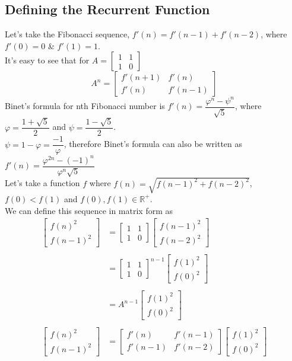 \documentclass[preprint,12pt]{elsarticle}
\begin{document}
	\subsection{Defining the Recurrent Function}
	Let's take the Fibonacci sequence, $f'(n) = f'(n - 1) + f'(n - 2)$, where $f'(0) = 0$ \& $f'(1) = 1$.\\
	It's easy to see that for $A  = \begin{bmatrix}1 & 1 \\ 1 & 0 \end{bmatrix}$ $$A^n = \begin{bmatrix}f'(n + 1) & f'(n) \\ f'(n) & f'(n - 1)\end{bmatrix}$$
	Binet's formula for nth Fibonacci number is $f'(n) = \dfrac{\varphi^n - \psi^n}{\sqrt{5}}$, where $\varphi = \dfrac{1 + \sqrt{5}}{2}$ and $\psi = \dfrac{1 - \sqrt{5}}{2}$\cite{Fn-wiki}.\\
	$\psi = 1 - \varphi = \dfrac{-1}{\varphi}$, therefore Binet's formula can also be written as 
	$f'(n) = \dfrac{\varphi^{2n} - (-1)^n}{\varphi^n\sqrt{5}}$\\
	Let's take a function \(f\) where $f(n) = \sqrt{f(n - 1)^2 + f(n - 2)^2}$, \(f(0) < f(1)\) and $f(0), f(1) \in \mathbb{R}^{+}$.\\
	We can define this sequence in matrix form as
	\begin{align*}
	\begin{bmatrix}f(n)^2 \\f(n - 1)^2\end{bmatrix} 
	&=
	\begin{bmatrix}1 & 1\\1 & 0\end{bmatrix}
	\begin{bmatrix}f(n - 1)^2\\f(n - 2)^2\end{bmatrix} \\\\
	&= \begin{bmatrix}1 & 1 \\1 & 0\end{bmatrix}^{\!n - 1}
	\begin{bmatrix}f(1)^2\\f(0)^2\end{bmatrix}\\\\
	&= A^{\!n - 1}\begin{bmatrix}f(1)^2\\f(0)^2\end{bmatrix}\\\\
	\begin{bmatrix}f(n)^2 \\f(n - 1)^2\end{bmatrix}
	&= \begin{bmatrix}f'(n) & f'(n - 1) \\ f'(n - 1) & f'(n - 2)\end{bmatrix}
	\begin{bmatrix}f(1)^2 \\f(0)^2\end{bmatrix}\\
	\end{align*}
\end{document}
